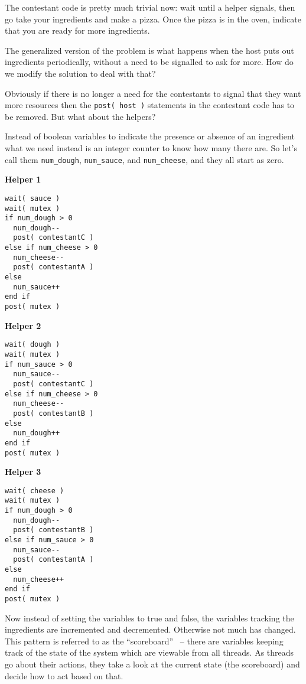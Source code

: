 The contestant code is pretty much trivial now: wait until a helper signals, then go take your ingredients and make a pizza. Once the pizza is in the oven, indicate that you are ready for more ingredients.

The generalized version of the problem is what happens when the host puts out ingredients periodically, without a need to be signalled to ask for more. How do we modify the solution to deal with that?

Obviously if there is no longer a need for the contestants to signal that they want more resources then the \texttt{post( host )} statements in the contestant code has to be removed. But what about the helpers?

Instead of boolean variables to indicate the presence or absence of an ingredient what we need instead is an integer counter to know how many there are. So let's call them \texttt{num\_dough}, \texttt{num\_sauce}, and \texttt{num\_cheese}, and they all start as zero.

\begin{multicols}{3}
	\textbf{Helper 1}
	\begin{lstlisting}
wait( sauce )
wait( mutex )
if num_dough > 0  
  num_dough--
  post( contestantC )
else if num_cheese > 0
  num_cheese--
  post( contestantA )
else
  num_sauce++
end if  
post( mutex )
\end{lstlisting}
	\columnbreak
	\textbf{Helper 2}
	\begin{lstlisting}
wait( dough )
wait( mutex )
if num_sauce > 0  
  num_sauce--
  post( contestantC )
else if num_cheese > 0
  num_cheese--
  post( contestantB )
else
  num_dough++
end if  
post( mutex )
\end{lstlisting}
	\columnbreak
	\textbf{Helper 3}
	\begin{lstlisting}
wait( cheese )
wait( mutex )
if num_dough > 0 
  num_dough--
  post( contestantB )
else if num_sauce > 0
  num_sauce--
  post( contestantA )
else
  num_cheese++
end if  
post( mutex )
\end{lstlisting}
\end{multicols}

Now instead of setting the variables to true and false, the variables tracking the ingredients are incremented and decremented. Otherwise not much has changed. This pattern is referred to as the ``scoreboard''~\cite{lbs} -- there are variables keeping track of the state of the system which are viewable from all threads. As threads go about their actions, they take a look at the current state (the scoreboard) and decide how to act based on that.

